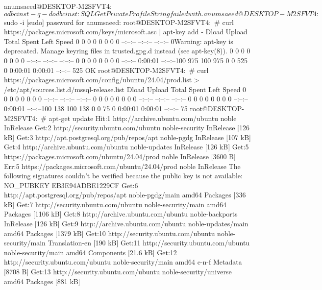 anumsaeed@DESKTOP-M2SFVT4:~$ odbcinst -q -d
odbcinst: SQLGetPrivateProfileString failed with .
anumsaeed@DESKTOP-M2SFVT4:~$ sudo -i
[sudo] password for anumsaeed:
root@DESKTOP-M2SFVT4:~# curl https://packages.microsoft.com/keys/microsoft.asc | apt-key add -
                                 Dload  Upload   Total   Spent    Left  Speed
  0     0    0     0    0     0      0      0 --:--:-- --:--:-- --:--:--     0Warning: apt-key is deprecated. Manage keyring files in trusted.gpg.d instead (see apt-key(8)).
  0     0    0     0    0     0      0      0 --:--:-- --:--:-- --:--:--  0     0    0     0    0     0      0      0 --:--:--  0:00:01 --:--:--100   975  100   975    0     0    525      0  0:00:01  0:00:01 --:--:--   525
OK
root@DESKTOP-M2SFVT4:~# curl https://packages.microsoft.com/config/ubuntu/24.04/prod.list > /etc/apt/sources.list.d/mssql-release.list
                                 Dload  Upload   Total   Spent    Left  Speed
  0     0    0     0    0     0      0      0 --:--:-- --:--:-- --:--:--  0     0    0     0    0     0      0      0 --:--:-- --:--:-- --:--:--  0     0    0     0    0     0      0      0 --:--:--  0:00:01 --:--:--100   138  100   138    0     0     75      0  0:00:01  0:00:01 --:--:--    75
root@DESKTOP-M2SFVT4:~# apt-get update
Hit:1 http://archive.ubuntu.com/ubuntu noble InRelease
Get:2 http://security.ubuntu.com/ubuntu noble-security InRelease [126 kB]
Get:3 http://apt.postgresql.org/pub/repos/apt noble-pgdg InRelease [107 kB]
Get:4 http://archive.ubuntu.com/ubuntu noble-updates InRelease [126 kB]
Get:5 https://packages.microsoft.com/ubuntu/24.04/prod noble InRelease [3600 B]
Err:5 https://packages.microsoft.com/ubuntu/24.04/prod noble InRelease
  The following signatures couldn't be verified because the public key is not available: NO_PUBKEY EB3E94ADBE1229CF
Get:6 http://apt.postgresql.org/pub/repos/apt noble-pgdg/main amd64 Packages [336 kB]
Get:7 http://security.ubuntu.com/ubuntu noble-security/main amd64 Packages [1106 kB]
Get:8 http://archive.ubuntu.com/ubuntu noble-backports InRelease [126 kB]
Get:9 http://archive.ubuntu.com/ubuntu noble-updates/main amd64 Packages [1379 kB]
Get:10 http://security.ubuntu.com/ubuntu noble-security/main Translation-en [190 kB]
Get:11 http://security.ubuntu.com/ubuntu noble-security/main amd64 Components [21.6 kB]
Get:12 http://security.ubuntu.com/ubuntu noble-security/main amd64 c-n-f Metadata [8708 B]
Get:13 http://security.ubuntu.com/ubuntu noble-security/universe amd64 Packages [881 kB]
